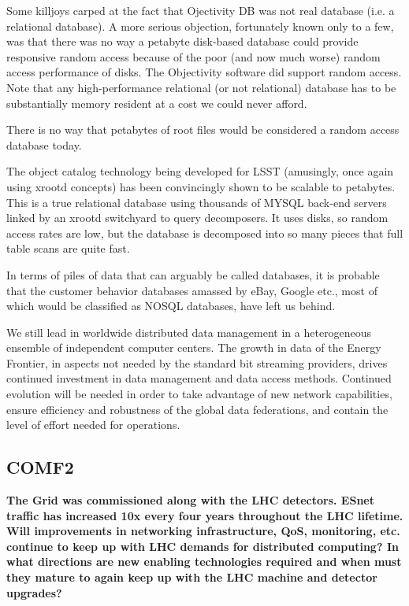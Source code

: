 Some killjoys carped at the fact that Ojectivity DB was not real database
(i.e. a relational database).  A more serious objection, fortunately known
only to a few, was that there was no way a petabyte disk-based database
could provide responsive random access because of the poor (and now much
worse) random access performance of disks.  The Objectivity software did
support random access.  Note that any high-performance relational (or not
relational) database has to be substantially memory resident at a cost we
could never afford.

There is no way that petabytes of root files would be considered a random
access database today.

The object catalog technology being developed for LSST (amusingly, once
again using xrootd concepts) has been convincingly shown to be scalable to
petabytes.  This is a true relational database using thousands of MYSQL
back-end servers linked by an xrootd switchyard to query decomposers.  It
uses disks, so random access rates are low, but the database is decomposed
into so many pieces that full table scans are quite fast.

In terms of piles of data that can arguably be called databases, it is
probable that the customer behavior databases amassed by eBay, Google
etc., most of which would be classified as NOSQL databases, have left us
behind.

We still lead in worldwide distributed data management in a heterogeneous
ensemble of independent computer centers.
The growth in data  of the Energy Frontier, in aspects not needed by the standard bit streaming providers,  drives  continued investment in data management and data access methods. Continued evolution will be needed in order to take advantage of new network capabilities, ensure efficiency and robustness of the global data federations,  and contain the level of effort needed for operations.

 


\subsection{COMF2}

{\bf
The Grid was commissioned along with the LHC detectors. ESnet traffic has
increased 10x every four years throughout the LHC lifetime. Will improvements in
networking infrastructure, QoS, monitoring, etc. continue to keep up with LHC 
demands for distributed computing? In what directions are new enabling technologies
required and when must they mature to again keep up with the LHC machine and
detector upgrades? }


